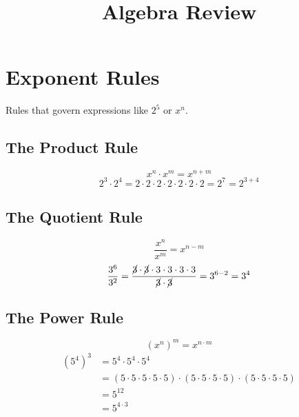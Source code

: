 \documentclass{article}
\title{Algebra Review}
\date{}
\begin{document}
    \maketitle
    \newpage
    
    
    \section{Exponent Rules}
    Rules that govern expressions like $2^5$ or $x^n$.
    
    \subsection{The Product Rule}
    \begin{equation}
        x^n \cdot x^m = x^{n+m}
    \end{equation}
    \begin{equation*}
        2^3 \cdot 2^4 = 2 \cdot 2 \cdot 2 \cdot 2 \cdot 2 \cdot 2 \cdot 2 = 2^7 = 2^{3+4}
    \end{equation*}
    
    \subsection{The Quotient Rule}
    \begin{equation}
        \frac{x^n}{x^m} = x^{n-m}
    \end{equation}
    \begin{equation*}
        \frac{3^6}{3^2} = \frac{\cancel{3} \cdot \cancel{3} \cdot 3 \cdot 3 \cdot 3 \cdot 3}{\cancel{3} \cdot \cancel{3}} = 3^{6-2} = 3^4
    \end{equation*}
    
    \subsection{The Power Rule}
    \begin{equation}
        (x^n)^m = x^{n \cdot m}
    \end{equation}
    \begin{align*}
        (5^4)^3 &= 5^4 \cdot 5^4 \cdot 5^4 \\
        &= (5 \cdot 5 \cdot 5 \cdot 5 \cdot 5) \cdot (5 \cdot 5 \cdot 5 \cdot 5) \cdot (5 \cdot 5 \cdot 5 \cdot 5) \\
        &= 5^{12} \\
        &= 5^{4 \cdot 3}
    \end{align*}
    
\end{document}
